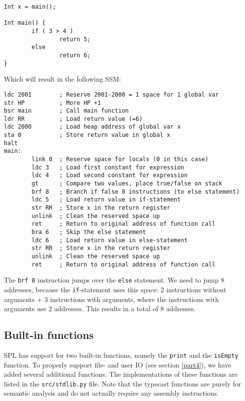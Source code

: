 \documentclass[a4paper]{article}
\begin{document}
\begin{lstlisting}
Int x = main();

Int main() {
        if ( 3 > 4 )
                return 5;
        else
                return 6;
}       
\end{lstlisting}
Which will result in the following SSM:
\begin{lstlisting}
ldc 2001        ; Reserve 2001-2000 = 1 space for 1 global var
str HP          ; More HP +1
bsr main        ; Call main function
ldr RR          ; Load return value (=6)
ldc 2000        ; Load heap address of global var x
sta 0           ; Store return value in global x
halt
main:           
        link 0  ; Reserve space for locals (0 in this case)
        ldc 3   ; Load first constant for expression
        ldc 4   ; Load second constant for expression
        gt      ; Compare two values, place true/false on stack
        brf 8   ; Branch if false 8 instructions (to else statement)
        ldc 5   ; Load return value in if-statement
        str RR  ; Store x in the return register
        unlink  ; Clean the reserved space up
        ret     ; Return to original address of function call
        bra 6   ; Skip the else statement
        ldc 6   ; Load return value in else-statement
        str RR  ; Store x in the return register
        unlink  ; Clean the reserved space up
        ret     ; Return to original address of function call
\end{lstlisting}
The {\tt brf 8} instruction jumps over the {\tt else} statement. We need to jump 8 addresses, because the {\tt if}-statement uses this space: 2 instructions without arguments + 3 instructions with arguments, where the instructions with arguments use 2 addresses. This results in a total of 8 addresses.

\subsection{Built-in functions}\label{built-ins}
SPL has support for two built-in functions, namely the {\tt print} and the {\tt isEmpty} function. To properly support file- and user IO (see section \ref{part4}), we have added several additional functions. The implementations of these functions are listed in the {\tt src/stdlib.py} file. Note that the typecast functions are purely for semantic analysis and do not actually require any assembly instructions.
\end{document}
